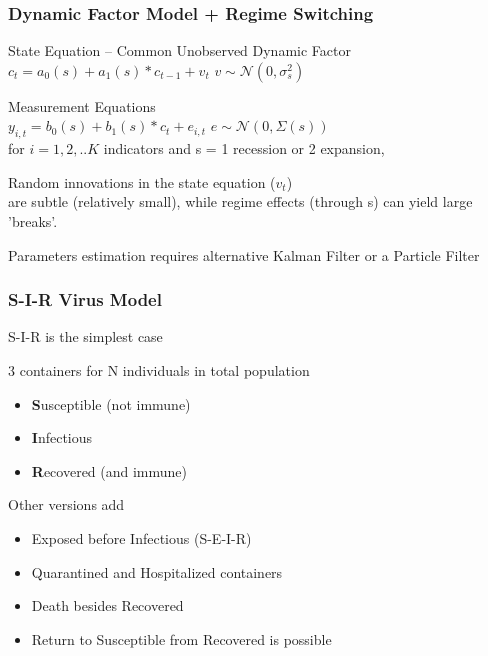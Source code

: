 \documentclass{beamer}
\begin{document}
\begin{frame}
	\frametitle{Dynamic Factor Model + Regime Switching}
	
\medskip
State Equation -- Common Unobserved Dynamic Factor	\\
	
\hspace{.25in} 	
	$ c_{t} = a_{0}(s) + a_{1}(s) * c_{t-1} + v_{t} $  
	\hspace{.25in} 
	$  v \sim \mathcal{N}(0,\sigma_s^2)  $
	
\medskip
Measurement Equations 	\\
\hspace{.25in} 
	$ y_{i,t} =  b_{0}(s) + b_{1}(s)  * c_{t} + e_{i,t}  $
	\hspace{.25in} 
	$  e \sim \mathcal{N}(0,\Sigma(s))  $
	\\
\hspace{.25in} 
	for $i = 1,2, .. K$ indicators
	and s = 1 recession or 2 expansion,
	
\medskip
Random innovations in the state equation ($v_t$) \\
are subtle (relatively small), while regime effects (through s) can yield large 'breaks'.
	
	\medskip
	Parameters estimation requires alternative Kalman Filter or a Particle Filter
	
\end{frame}



\begin{frame}
	\frametitle{S-I-R Virus Model}
	
{\large	S-I-R is the simplest case}
	
	\hspace{.20in} 3 containers for N individuals in total population
	
	\begin{itemize}
	\item
	\textbf{S}usceptible (not immune)\\
	
	\item
	\textbf{I}nfectious\\
	
	\item
	\textbf{R}ecovered (and immune) \\
	
	\end{itemize}

\medskip
	Other versions add \\
	\begin{itemize}
	\item
	Exposed before Infectious (S-E-I-R) \\
	\item
	Quarantined and Hospitalized containers 
	\item
	Death besides Recovered \\
	\item
	Return to Susceptible from Recovered is possible  
	\end{itemize}
	
\end{frame}
\end{document}
